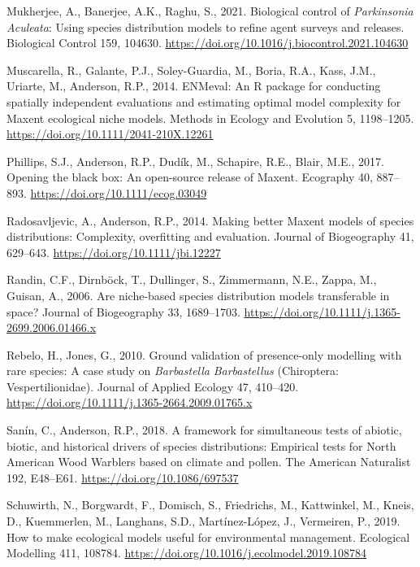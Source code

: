 \documentclass[12pt,]{article}
\begin{document}
\begin{CSLReferences}{1}{0}
\leavevmode\hypertarget{ref-Mukherjee2021}{}%
Mukherjee, A., Banerjee, A.K., Raghu, S., 2021. Biological control of
{\emph{Parkinsonia}}{ \emph{Aculeata}}: {Using} species distribution
models to refine agent surveys and releases. Biological Control 159,
104630. \url{https://doi.org/10.1016/j.biocontrol.2021.104630}

\leavevmode\hypertarget{ref-Muscarella2014}{}%
Muscarella, R., Galante, P.J., Soley-Guardia, M., Boria, R.A., Kass,
J.M., Uriarte, M., Anderson, R.P., 2014. {ENMeval}: {An R} package for
conducting spatially independent evaluations and estimating optimal
model complexity for {Maxent} ecological niche models. Methods in
Ecology and Evolution 5, 1198--1205.
\url{https://doi.org/10.1111/2041-210X.12261}

\leavevmode\hypertarget{ref-Phillips2017}{}%
Phillips, S.J., Anderson, R.P., Dudík, M., Schapire, R.E., Blair, M.E.,
2017. Opening the black box: An open-source release of {Maxent}.
Ecography 40, 887--893. \url{https://doi.org/10.1111/ecog.03049}

\leavevmode\hypertarget{ref-Radosavljevic2014}{}%
Radosavljevic, A., Anderson, R.P., 2014. Making better {Maxent} models
of species distributions: Complexity, overfitting and evaluation.
Journal of Biogeography 41, 629--643.
\url{https://doi.org/10.1111/jbi.12227}

\leavevmode\hypertarget{ref-Randin2006}{}%
Randin, C.F., Dirnböck, T., Dullinger, S., Zimmermann, N.E., Zappa, M.,
Guisan, A., 2006. Are niche-based species distribution models
transferable in space? Journal of Biogeography 33, 1689--1703.
\url{https://doi.org/10.1111/j.1365-2699.2006.01466.x}

\leavevmode\hypertarget{ref-Rebelo2010}{}%
Rebelo, H., Jones, G., 2010. Ground validation of presence-only
modelling with rare species: A case study on {\emph{Barbastella}}{
\emph{Barbastellus}} ({Chiroptera}: {Vespertilionidae}). Journal of
Applied Ecology 47, 410--420.
\url{https://doi.org/10.1111/j.1365-2664.2009.01765.x}

\leavevmode\hypertarget{ref-Sanin2018}{}%
Sanín, C., Anderson, R.P., 2018. A framework for simultaneous tests of
abiotic, biotic, and historical drivers of species distributions:
Empirical tests for {North American Wood Warblers} based on climate and
pollen. The American Naturalist 192, E48--E61.
\url{https://doi.org/10.1086/697537}

\leavevmode\hypertarget{ref-Schuwirth2019}{}%
Schuwirth, N., Borgwardt, F., Domisch, S., Friedrichs, M., Kattwinkel,
M., Kneis, D., Kuemmerlen, M., Langhans, S.D., Martínez-López, J.,
Vermeiren, P., 2019. How to make ecological models useful for
environmental management. Ecological Modelling 411, 108784.
\url{https://doi.org/10.1016/j.ecolmodel.2019.108784}


\end{CSLReferences}
\end{document}
